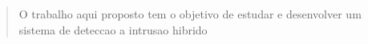 \begin{abstract}
	O trabalho aqui proposto tem o objetivo de estudar e desenvolver um sistema de deteccao a intrusao hibrido
\end{abstract}
